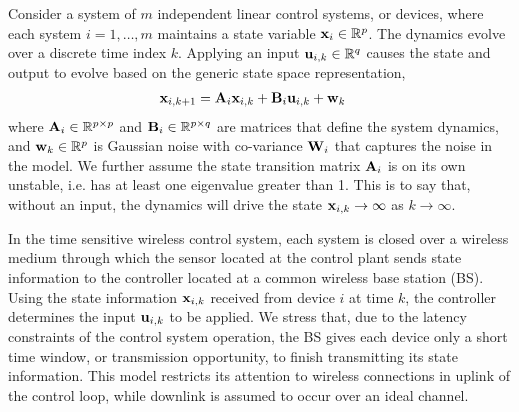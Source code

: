 %


Consider a system of $m$ independent linear control systems, or devices, where each system $i=1,\hdots,m$ maintains a state variable ${\mathbf x}_{i} \in {\mathbb R}^p$. The dynamics evolve over a discrete time index $k$.  Applying an input ${\mathbf u}_{i,k} \in {\mathbb R}^q$ causes the state and output to evolve based on the generic state space representation,
%
\begin{align}\label{eq_control_orig}
{\ensuremath{\mathbf x}}_{i,k+1} &= {\mathbf A}_{i} {\mathbf x}_{i,k} + {\mathbf B}_{i} {\mathbf u}_{i,k} + {\mathbf w}_k
\end{align}
%
where ${\mathbf A}_{i} \in {\mathbb R}^{p \times p}$ and ${\mathbf B}_{i} \in {\mathbb R}^{p \times q}$ are matrices that define the system dynamics, and ${\mathbf w}_{k} \in {\mathbb R}^{p}$ is Gaussian noise with co-variance ${\mathbf W}_i$ that captures the noise in the model. We further assume the state transition matrix ${\mathbf A}_i$ is on its own unstable, i.e. has at least one eigenvalue greater than 1. This is to say that, without an input, the dynamics will drive the state ${\mathbf x}_{i,k} \rightarrow \infty$ as $k \rightarrow \infty$.

In the time sensitive wireless control system, each system is closed over a wireless medium through which the sensor located at the control plant sends state information to the controller located at a common wireless base station (BS). Using the state information ${\mathbf x}_{i,k}$ received from device $i$ at time $k$, the controller determines the input $ {\mathbf u}_{i,k}$ to be applied. We stress that, due to the latency constraints of the control system operation, the BS gives each device only a short time window, or transmission opportunity, to finish transmitting its state information. This model restricts its attention to wireless connections in uplink of the control loop, while downlink is assumed to occur over an ideal channel.

